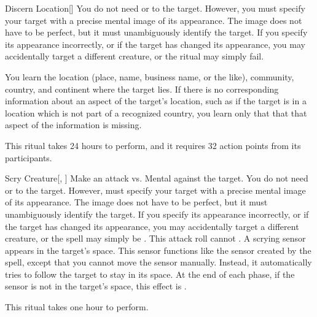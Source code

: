 \lowercase{\hypertarget{spell:Discern Location}{}}\label{spell:Discern Location}
\begin{apability}[\nth{4}]{\hypertarget{spell:Discern Location}{Discern Location}}[]
You do not need  or  to the target.
However, you must specify your target with a precise mental image of its appearance.
The image does not have to be perfect, but it must unambiguously identify the target.
If you specify its appearance incorrectly, or if the target has changed its appearance, you may accidentally target a different creature, or the ritual may simply fail.

You learn the location (place, name, business name, or the like), community, country, and continent where the target lies.
If there is no corresponding information about an aspect of the target's location, such as if the target is in a location which is not part of a recognized country,
you learn only that that that aspect of the information is missing.

This ritual takes 24 hours to perform, and it requires 32 action points from its participants.
\end{apability}
\vspace{0.25em}



\lowercase{\hypertarget{spell:Scry Creature}{}}\label{spell:Scry Creature}
\begin{apability}[\nth{4}]{\hypertarget{spell:Scry Creature}{Scry Creature}}[, ]
Make an attack vs. Mental against the target.
You do not need  or  to the target.
However,  must specify your target with a precise mental image of its appearance.
The image does not have to be perfect, but it must unambiguously identify the target.
If you specify its appearance incorrectly, or if the target has changed its appearance, you may accidentally target a different creature, or the spell may simply be .
This attack roll cannot .
\hit A scrying sensor appears in the target's space.
This sensor functions like the sensor created by the  spell, except that you cannot move the sensor manually.
Instead, it automatically tries to follow the target to stay in its space.
At the end of each phase, if the sensor is not in the target's space, this effect is .

This ritual takes one hour to perform.
\end{apability}
\vspace{0.25em}



